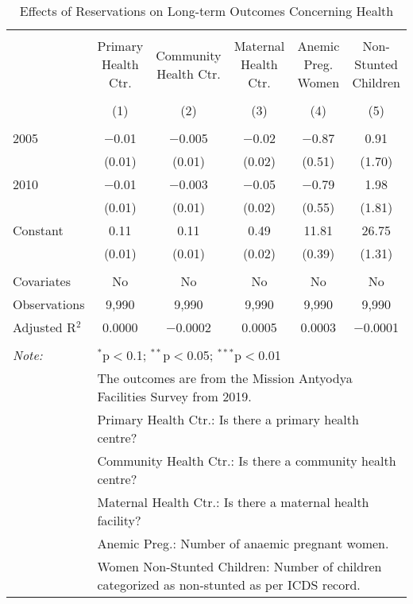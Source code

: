 
\begin{table}[!htbp] \centering 
  \caption{Effects of Reservations on Long-term Outcomes Concerning Health} 
  \label{up_shrug_health_05_10} 
\scriptsize 
\begin{tabular}{@{\extracolsep{0pt}}lccccc} 
\\[-1.8ex]\hline 
\hline \\[-1.8ex] 
 & Primary Health Ctr. & Community Health Ctr. & Maternal Health Ctr. & Anemic Preg. Women & Non-Stunted Children \\ 
\\[-1.8ex] & (1) & (2) & (3) & (4) & (5)\\ 
\hline \\[-1.8ex] 
 2005 & $-$0.01 & $-$0.005 & $-$0.02 & $-$0.87 & 0.91 \\ 
  & (0.01) & (0.01) & (0.02) & (0.51) & (1.70) \\ 
  2010 & $-$0.01 & $-$0.003 & $-$0.05 & $-$0.79 & 1.98 \\ 
  & (0.01) & (0.01) & (0.02) & (0.55) & (1.81) \\ 
  Constant & 0.11 & 0.11 & 0.49 & 11.81 & 26.75 \\ 
  & (0.01) & (0.01) & (0.02) & (0.39) & (1.31) \\ 
 \hline \\[-1.8ex] 
Covariates & No & No & No & No & No \\ 
Observations & 9,990 & 9,990 & 9,990 & 9,990 & 9,990 \\ 
Adjusted R$^{2}$ & 0.0000 & $-$0.0002 & 0.0005 & 0.0003 & $-$0.0001 \\ 
\hline 
\hline \\[-1.8ex] 
\textit{Note:}  & \multicolumn{5}{l}{$^{*}$p$<$0.1; $^{**}$p$<$0.05; $^{***}$p$<$0.01} \\ 
 & \multicolumn{5}{l}{The outcomes are from the Mission Antyodya Facilities Survey from 2019.} \\ 
 & \multicolumn{5}{l}{Primary Health Ctr.: Is there a primary health centre?} \\ 
 & \multicolumn{5}{l}{Community Health Ctr.: Is there a community health centre?} \\ 
 & \multicolumn{5}{l}{Maternal Health Ctr.: Is there a maternal health facility?} \\ 
 & \multicolumn{5}{l}{Anemic Preg.: Number of anaemic pregnant women.} \\ 
 & \multicolumn{5}{l}{Women Non-Stunted Children: Number of children categorized as non-stunted as per ICDS record.} \\ 
\end{tabular} 
\end{table} 
